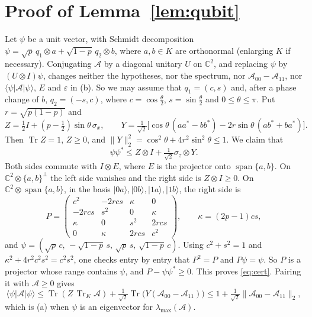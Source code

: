 \documentclass[11pt]{article}
\theoremstyle{remark}
\newcommand{\Tr}{\operatorname{Tr}}
\newcommand{\norm}[1]{\lVert #1\rVert}
\begin{document}
\section{Proof of Lemma~\ref{lem:qubit}}

Let $\psi$ be a unit vector, with Schmidt decomposition
$\psi=\sqrt p\,q_1\otimes a+\sqrt{1-p}\,q_2\otimes b$, where $a,b\in K$ are orthonormal (enlarging $K$ if necessary).
Conjugating $\mathcal A$ by a diagonal unitary $U$ on $\mathbb C^2$, and replacing $\psi$ by $(U\otimes I)\psi$,
changes neither the hypotheses, nor the spectrum, nor $\mathcal A_{00}-\mathcal A_{11}$, nor
$\langle\psi|\mathcal A|\psi\rangle$, $E$ and $\varepsilon$ in (b). So we may assume that $q_1=(c,s)$ and, after a phase change of $b$, $q_2=(-s,c)$, where
$c=\cos\frac\theta2$, $s=\sin\frac\theta2$ and $0\le\theta\le\pi$. Put $r=\sqrt{p(1-p)}$ and
\[
Z=\tfrac12I+(p-\tfrac12)\sin\theta\,\sigma_x,\qquad
Y=\tfrac1{\sqrt2}\big[\cos\theta\,(aa^*-bb^*)-2r\sin\theta\,(ab^*+ba^*)\big].
\]
Then $\Tr Z=1$, $Z\ge0$, and $\norm{Y}_2^2=\cos^2\theta+4r^2\sin^2\theta\le1$. We claim that
\begin{equation}\label{eq:cert}
\psi\psi^*\le Z\otimes I+\tfrac1{\sqrt2}\sigma_z\otimes Y .
\end{equation}
Both sides commute with $I\otimes E$, where $E$ is the projector onto $\operatorname{span}\{a,b\}$. On
$\mathbb C^2\otimes\{a,b\}^\perp$ the left side vanishes and the right side is $Z\otimes I\ge0$. On
$\mathbb C^2\otimes\operatorname{span}\{a,b\}$, in the basis $|0a\rangle,|0b\rangle,|1a\rangle,|1b\rangle$, the right
side is
\[
P=\begin{pmatrix}c^2&-2rcs&\kappa&0\\-2rcs&s^2&0&\kappa\\\kappa&0&s^2&2rcs\\0&\kappa&2rcs&c^2\end{pmatrix},
\qquad\kappa=(2p-1)cs,
\]
and $\psi=(\sqrt p\,c,\,-\sqrt{1-p}\,s,\,\sqrt p\,s,\,\sqrt{1-p}\,c)$. Using $c^2+s^2=1$ and
$\kappa^2+4r^2c^2s^2=c^2s^2$, one checks entry by entry that $P^2=P$ and $P\psi=\psi$. So $P$ is a projector whose
range contains $\psi$, and $P-\psi\psi^*\ge0$. This proves \eqref{eq:cert}. Pairing it with $\mathcal A\ge0$ gives
\begin{equation}
\langle\psi|\mathcal A|\psi\rangle\le\Tr(Z\,\Tr_K\mathcal A)
+\tfrac1{\sqrt2}\Tr\big(Y(\mathcal A_{00}-\mathcal A_{11})\big)
\le1+\tfrac1{\sqrt2}\norm{\mathcal A_{00}-\mathcal A_{11}}_2 ,
\end{equation}
which is (a) when $\psi$ is an eigenvector for $\lambda_{\max}(\mathcal A)$.
\end{document}

